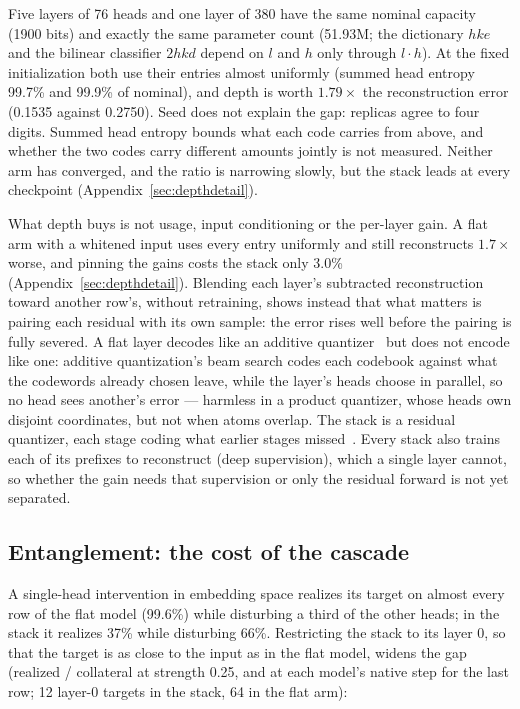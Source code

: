 Five layers of 76 heads and one layer of 380 have the same nominal
capacity (1900 bits) and exactly the same parameter count (51.93M; the
dictionary $hke$ and the bilinear classifier $2hkd$ depend on $l$ and $h$
only through $l\cdot h$). At the fixed initialization both use their
entries almost uniformly (summed head entropy 99.7\% and 99.9\% of
nominal), and depth is worth $1.79\times$ the reconstruction error
(0.1535 against 0.2750). Seed does not explain the gap: replicas agree to
four digits. Summed head entropy bounds what each code carries from above,
and whether the two codes carry different amounts jointly is not
measured. Neither arm has converged, and the ratio is narrowing slowly,
but the stack leads at every checkpoint
(Appendix~\ref{sec:depthdetail}).

What depth buys is not usage, input conditioning or the per-layer gain. A
flat arm with a whitened input uses every entry uniformly and still
reconstructs $1.7\times$ worse, and pinning the gains costs the stack only
3.0\% (Appendix~\ref{sec:depthdetail}). Blending each layer's subtracted
reconstruction toward another row's, without retraining, shows instead
that what matters is pairing each residual with its own sample: the error
rises well before the pairing is fully severed. A flat layer decodes like
an additive quantizer~\cite{babenko2014} but does not encode like one:
additive quantization's beam search codes each codebook against what the
codewords already chosen leave, while the layer's heads choose in
parallel, so no head sees another's error --- harmless in a product
quantizer, whose heads own disjoint coordinates, but not when atoms
overlap. The stack is a residual quantizer, each stage coding what earlier
stages missed~\cite{zeghidour2021}. Every stack also trains each of its prefixes
to reconstruct (deep supervision), which a single layer cannot, so
whether the gain needs that supervision or only the residual forward is
not yet separated.

\subsection{Entanglement: the cost of the cascade}
\label{sec:entangle}

A single-head intervention in embedding space realizes its target on
almost every row of the flat model (99.6\%) while disturbing a third of
the other heads; in the stack it realizes 37\% while disturbing 66\%.
Restricting the stack to its layer 0, so that the target is as close to
the input as in the flat model, widens the gap (realized / collateral at
strength 0.25, and at each model's native step for the last row; 12
layer-0 targets in the stack, 64 in the flat arm):

